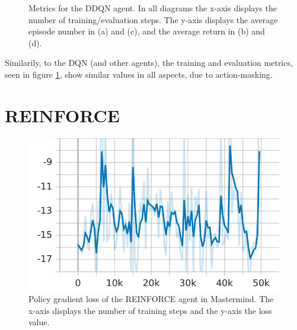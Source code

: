 \begin{figure}[H]
	\qquad
	\caption[DDQN Training]{Metrics for the DDQN agent. In all diagrams the x-axis displays the number of training/evaluation steps. The y-axis displays the average episode number in (a) and (c), and the average return in (b) and (d).}	
	\label{fig:ddqn_train}
\end{figure}

Similarily, to the DQN (and other agents), the training and evaluation metrics, seen in figure \ref{fig:ddqn_train}, show similar values in all aspects, due to action-masking.


\section{REINFORCE}

\begin{figure}[H]
	\centering
	\includegraphics[scale=.75]{images/stats/reinforce_50k/Losses_policy_gradient_loss}
	\caption[REINFORCE loss]{Policy gradient loss of the REINFORCE agent in Mastermind. The x-axis displays the number of training steps and the y-axis the loss value.}
	\label{fig:reinforce_loss}
\end{figure}

